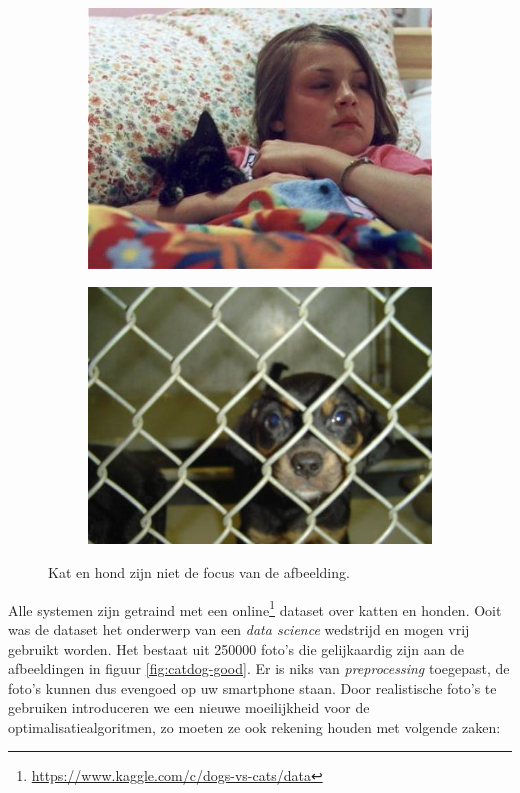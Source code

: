 \begin{figure}
    \begin{subfigure}{.5\textwidth}
        \centering
        \includegraphics[width=.8\linewidth]{img/bad_cat.jpg}
        \label{fig:cat-bad}
    \end{subfigure}%
    \begin{subfigure}{.5\textwidth}
        \centering
        \includegraphics[width=.8\linewidth]{img/bad_dog.jpg}
        \label{fig:dog-bad}
    \end{subfigure}
    \caption{Kat en hond zijn niet de focus van de afbeelding.}
    \label{fig:catdog-bad}
\end{figure}

Alle systemen zijn getraind met een online\footnote{\url{https://www.kaggle.com/c/dogs-vs-cats/data}} dataset over katten en honden. Ooit was de dataset het onderwerp van een \textit{data science} wedstrijd en mogen vrij gebruikt worden. Het bestaat uit 250000 foto's die gelijkaardig zijn aan de afbeeldingen in figuur \ref{fig:catdog-good}. Er is niks van \textit{preprocessing} toegepast, de foto's kunnen dus evengoed op uw smartphone staan. Door realistische foto's te gebruiken introduceren we een nieuwe moeilijkheid voor de optimalisatiealgoritmen, zo moeten ze ook rekening houden met volgende zaken: 

